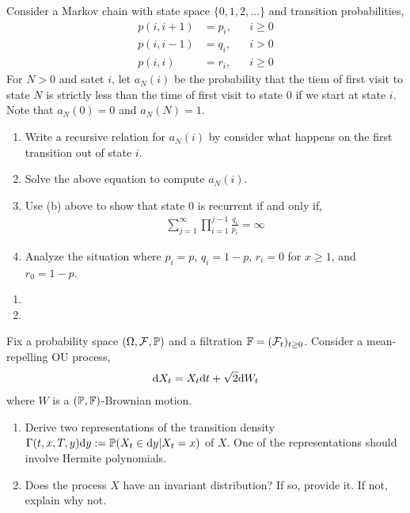 \begin{problem}
    Consider a Markov chain with state space \( \{0,1,2,\ldots\} \) and transition probabilities,
    \begin{align*}
        p(i,i+1) &= p_i, && i\geq 0 \\
        p(i,i-1) &= q_i, && i> 0 \\
        p(i,i) &= r_i, && i\geq 0
    \end{align*}
    For \( N > 0 \) and satet \( i \), let \( a_N(i) \) be the probability that the tiem of first visit to state \( N \) is strictly less than the time of first visit to state \( 0 \) if we start at state \( i \). Note that \( a_N(0) = 0 \) and \( a_N(N) = 1 \).
\begin{enumerate}[nolistsep,label=(\alph*)]
    \item Write a recursive relation for \( a_N(i) \) by consider what happens on the first transition out of state \( i \).
    \item Solve the above equation to compute \( a_N(i) \).
    \item Use (b) above to show that state 0 is recurrent if and only if,
        \begin{align*}
            \sum_{j=1}^{\infty} \prod_{i=1}^{j-1} \frac{q_i}{p_i} = \infty
        \end{align*}
    \item Analyze the situation where \( p_i = p \), \( q_i = 1-p \), \( r_i = 0 \) for \( x \geq 1 \), and \( r_0 = 1-p \).
\end{enumerate}

\end{problem}

\begin{solution}[Solution]
\begin{enumerate}[label=(\alph*)]
    \item 
    \item 
\end{enumerate}
\end{solution}


\begin{problem}
    Fix a probability space \( (\Omega,\mathcal{F},\mathbb{P}) \) and a filtration \( \mathbb{F} = (\mathcal{F}_t)_{t\geq 0} \). Consider a mean-repelling OU process,
    \begin{align*}
        \mathrm{d} X_t = X_t\mathrm{d} t + \sqrt{2} \mathrm{d} W_t
    \end{align*}
    where \( W \) is a \( (\mathbb{P},\mathbb{F}) \)-Brownian motion.
\begin{enumerate}[nolistsep,label=(\alph*)]
    \item Derive two representations of the transition density \( \Gamma(t,x,T,y)\mathrm{d} y := \mathbb{P}(X_t \in\mathrm{d} y | X_t = x) \) of \( X \). One of the representations should involve Hermite polynomials.
    \item Does the process \( X \) have an invariant distribution? If so, provide it. If not, explain why not.
\end{enumerate}
\end{problem}

